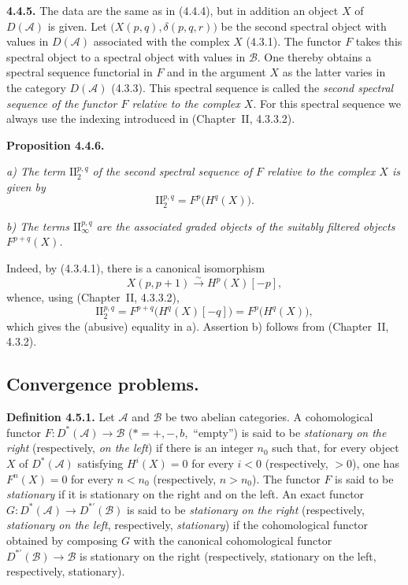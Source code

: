 \clearpage
{}%
\begingroup\small\setlength{\parskip}{0pt}\setlength{\emergencystretch}{1.5em}
\setlength{\abovedisplayskip}{4pt plus 2pt minus 2pt}%
\setlength{\belowdisplayskip}{4pt plus 2pt minus 2pt}%

\noindent\textbf{4.4.5.}\quad
The data are the same as in (4.4.4), but in addition an object $X$ of
$D(\mathcal A)$ is given. Let $\bigl(X(p,q),\delta(p,q,r)\bigr)$ be the
second spectral object with values in $D(\mathcal A)$ associated with the
complex $X$ (4.3.1). The functor $F$ takes this spectral object to a
spectral object with values in $\mathcal B$. One thereby obtains a spectral
sequence functorial in $F$ and in the argument $X$ as the latter varies in
the category $D(\mathcal A)$ (4.3.3). This spectral sequence is called the
\emph{second spectral sequence of the functor $F$ relative to the complex
$X$}. For this spectral sequence we always use the indexing introduced in
(Chapter~II, 4.3.3.2).

\medskip\noindent\textbf{Proposition 4.4.6.}\quad

\noindent\textit{a) The term $\mathrm{II}_2^{p,q}$ of the second spectral
sequence of $F$ relative to the complex $X$ is given by}
\[
\mathrm{II}_2^{p,q}=F^p\bigl(H^q(X)\bigr).
\]

\noindent\textit{b) The terms $\mathrm{II}_{\infty}^{p,q}$ are the
associated graded objects of the suitably filtered objects $F^{p+q}(X)$.}

Indeed, by (4.3.4.1), there is a canonical isomorphism
\[
X(p,p+1)\xrightarrow{\sim}H^p(X)[-p],
\]
whence, using (Chapter~II, 4.3.3.2),
\[
\mathrm{II}_2^{p,q}
=F^{p+q}\bigl(H^q(X)[-q]\bigr)
=F^p\bigl(H^q(X)\bigr),
\]
which gives the (abusive) equality in a). Assertion b) follows from
(Chapter~II, 4.3.2).

\subsection{Convergence problems.}

\noindent\textbf{Definition 4.5.1.}\quad
Let $\mathcal A$ and $\mathcal B$ be two abelian categories. A
cohomological functor $F\colon D^*(\mathcal A)\longrightarrow\mathcal B$
($*=+,-,b,{}$ ``empty'') is said to be \emph{stationary on the right}
(respectively, \emph{on the left}) if there is an integer $n_0$ such that,
for every object $X$ of $D^*(\mathcal A)$ satisfying $H^i(X)=0$ for every
$i<0$ (respectively, $>0$), one has $F^n(X)=0$ for every $n<n_0$
(respectively, $n>n_0$). The functor $F$ is said to be \emph{stationary} if
it is stationary on the right and on the left. An exact functor
$G\colon D^*(\mathcal A)\longrightarrow D^{*'}(\mathcal B)$ is said to be
\emph{stationary on the right} (respectively, \emph{stationary on the
left}, respectively, \emph{stationary}) if the cohomological functor
obtained by composing $G$ with the canonical cohomological functor
$D^{*'}(\mathcal B)\longrightarrow\mathcal B$ is stationary on the right
(respectively, stationary on the left, respectively, stationary).
\endgroup
